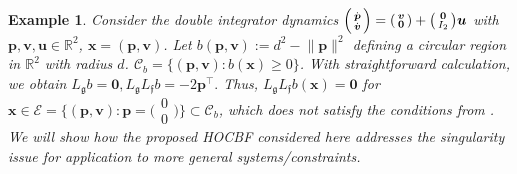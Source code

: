 \documentclass[letterpaper, 10 pt, journal, twoside]{IEEEtran}
\theoremstyle{plain}
\newtheorem{example}{Example}
\newcommand{\myvar}[1]{\bm{#1}}
\newcommand{\myvardot}[1]{\dot{\myvar{#1}}}
\newcommand{\myset}[1]{\mathscr{#1}}
\begin{document}
\begin{example} \label{exp:circular_constraint}
Consider the double integrator dynamics $\begin{psmallmatrix}
\myvardot{p} \\
\myvardot{v}
\end{psmallmatrix} =  \begin{psmallmatrix}
\myvar{v} \\
\myvar{0}
\end{psmallmatrix} +  \begin{psmallmatrix}
\myvar{0} \\
I_2
\end{psmallmatrix} \myvar{u}$
with $\myvar{p}, \myvar{v}, \myvar{u}\in \mathbb{R}^2$, $\myvar{x} = (\myvar{p}, \myvar{v})$. Let $b( \myvar{p},\myvar{v}) := d^2 - \lVert \myvar{p} \rVert^2$ defining a circular region  in $\mathbb{R}^2$ with radius $d $.  $\myset{C}_{b} = \{ (\myvar{p},\myvar{v}): b(\myvar{x}) \ge 0  \}$. With straightforward calculation, we obtain $L_{\mathfrak{g}} b = \myvar{0}, L_{\mathfrak{g}}L_{\mathfrak{f}}b = -2\myvar{p}^\top.$
Thus, $ L_{\mathfrak{g}}L_{\mathfrak{f}}b(\myvar{x}) = \myvar{0}$ for  $\myvar{x}\in \myset{E} = \{ (\myvar{p},\myvar{v}): \myvar{p} =  \big(\begin{smallmatrix}
  0\\
  0
\end{smallmatrix}\big) \} \subset \myset{C}_b$, which does not satisfy the conditions from \cite{xiao2019control,wences2020correct}. We will show how the proposed HOCBF considered here addresses the singularity issue for application {to} more general systems/constraints.
\end{example}
\end{document}
